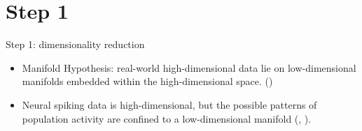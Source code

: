 \documentclass[xcolor={dvipsnames,svgnames}]{beamer}
\begin{document}
\section{Step 1}

\begin{frame}{Step 1: dimensionality reduction}
    
    \begin{itemize}
        \item Manifold Hypothesis: real-world high-dimensional data lie on low-dimensional manifolds embedded within the high-dimensional space. (\cite{deepai_2019})
        \item  Neural spiking data is high-dimensional, but the possible patterns of population activity  are confined to a low-dimensional manifold (\cite{stopfer_intensity_2003},  \cite{yu_gaussian-process_2009}).
    \end{itemize}
    \end{frame}
    
\end{document}
